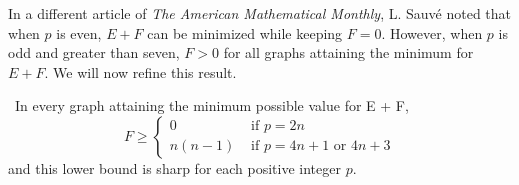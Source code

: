 \documentclass[10pt]{amsart}
\begin{document}
In a different article of \emph{The American Mathematical Monthly},
L. Sauv\'e \cite{LS} noted that when $p$ is even, $E + F$ can be minimized while keeping $F = 0$. However, 
when $p$ is odd and greater than seven, $F > 0$ for all graphs attaining the minimum for $E + F$.
We will now refine this result.

\begin{theorem} \
    In every graph attaining the minimum possible value for E + F,
    \begin{equation}
        F \geq \begin{cases}
                    0 & \text{ if } p = 2n \\
                    n(n - 1) & \text{ if } p = 4n + 1 \text{ or } 4n + 3
                \end{cases} \label{eq:theorem2}
    \end{equation}
    and this lower bound is sharp for each positive integer $p$.
\end{theorem}

\end{document}
